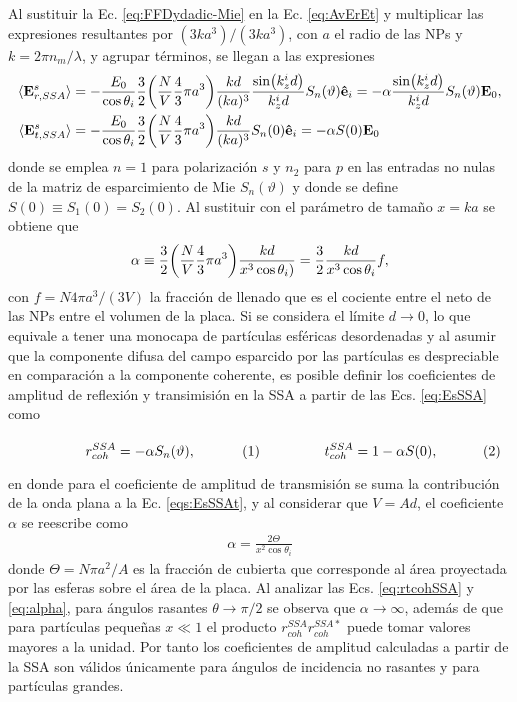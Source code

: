 Al sustituir la Ec. \eqref{eq:FFDydadic-Mie} en la Ec. \eqref{eq:AvErEt} y multiplicar las expresiones resultantes por $(3ka^3)/(3ka^3)$, con $a$ el radio de las NPs y $k = 2\pi n_m /\lambda$, y agrupar términos, se llegan a las expresiones 
	\begin{subequations}\begin{align}
		\langle \vb{E}^s_{r,SSA}\rangle & = - \frac{E_0}{\cos\theta_i} \frac32  \qty(\frac{N}{V} \frac43\pi a^3)\frac{kd}{(ka)^3}   \frac{\sin(k_z^id)}{k_z^i d}  S_n(\vartheta)\vu{e}_i =
		-\alpha  \frac{\sin(k_z^id)}{k_z^i d}   S_n(\vartheta) \vb{E}_0,
		\label{eqs:EsSSAr}\\
	\langle \vb{E}^s_{t,SSA}\rangle &=  - \frac{E_0}{\cos\theta_i} \frac32
						 \qty(\frac{N}{V}\frac43\pi a^3  ) \frac{kd}{(ka)^3}  S_n(0) \vu{e}_i  
						 = - \alpha S(0) \vb{E}_0
		\label{eqs:EsSSAt}
	\end{align}\label{eq:EsSSA}\end{subequations}
donde  se emplea $n=1$ para polarización $s$ y $n_2$ para $p$ en las entradas no nulas de la matriz de esparcimiento de Mie $S_n(\vartheta)$ y donde se define $S(0) \equiv S_1(0)=S_2(0)$. Al sustituir con el parámetro de tamaño $x=ka$ se obtiene que  
\begin{align*}
	\alpha \equiv \frac32 \qty(\frac{N}{V}\frac43 \pi a^3  )\frac{kd}{x^3\cos\theta_i)} = \frac32\frac{kd}{ x^3\cos\theta_i} f,
	\end{align*}
con $f= N 4\pi a^3/(3V)$ la fracción de llenado que es el cociente entre el neto de las NPs entre el volumen de la placa. Si se considera el límite $d\to 0$, lo que equivale a tener una monocapa de partículas esféricas desordenadas y al asumir que la componente difusa del campo esparcido por las partículas es despreciable en comparación a la componente coherente, es posible definir los coeficientes de amplitud de reflexión y transimisión en la SSA a partir de las Ecs. \eqref{eq:EsSSA} como \vspace*{-.5em}	
	
	\begin{subequations}\eqhalf{r_{coh}^{SSA} = -\alpha S_n(\vartheta),}
	\eqhalf{t_{coh}^{SSA} = 1 - \alpha S(0), }
	\label{eq:rtcohSSA}\end{subequations}\vspace*{-.5em}	
	
\noindent en donde para el coeficiente de amplitud de transmisión se suma la contribución de la onda plana a la Ec. \eqref{eqs:EsSSAt}, y al considerar que $V = A d$, el coeficiente $\alpha$ se reescribe como
	\begin{align}
	\alpha = \frac{2\Theta}{x^2 \cos\theta_i}
	\label{eq:alpha}
	\end{align}
donde $\Theta = N \pi a^2 / A$ es la fracción de cubierta que corresponde al área proyectada por las esferas sobre el área de la placa. Al analizar  las Ecs. \eqref{eq:rtcohSSA} y \eqref{eq:alpha}, para ángulos rasantes $\theta\to \pi/2$ se observa que $\alpha\to \infty$, además de que para partículas pequeñas $x\ll 1$ el producto $r_{coh}^{SSA}r_{coh}^{SSA*}$ puede tomar valores mayores a la unidad. Por tanto los coeficientes de amplitud calculadas a partir de la SSA son válidos únicamente para ángulos de incidencia no rasantes y para partículas grandes. 

